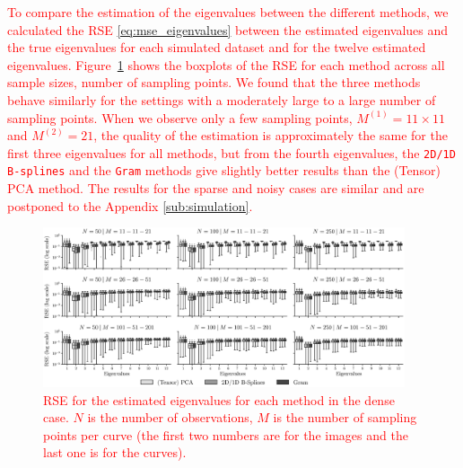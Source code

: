 \begin{results}
\textcolor{red}{To compare the estimation of the eigenvalues between the different methods, we calculated the RSE \eqref{eq:mse_eigenvalues} between the estimated eigenvalues and the true eigenvalues for each simulated dataset and for the twelve estimated eigenvalues.
Figure~\ref{fig:logAE_mfd_1d} shows the boxplots of the RSE for each method across all sample sizes, number of sampling points. We found that the three methods behave similarly for the settings with a moderately large to a large number of sampling points. When we observe only a few sampling points, $M^{(1)} = 11 \times 11$ and $M^{(2)} = 21$, the quality of the estimation is approximately the same for the first three eigenvalues for all methods, but from the fourth eigenvalues, the \texttt{2D/1D B-splines} and the \texttt{Gram} methods give slightly better results than the (Tensor) PCA method. The results for the sparse and noisy cases are similar and are postponed to the Appendix \ref{sub:simulation}.}

\begin{figure}
    \centering
    \includegraphics[width=0.95\textwidth]{figures/AE.eps}
    \caption{\textcolor{red}{RSE for the estimated eigenvalues for each method in the dense case. $N$ is the number of observations, $M$ is the number of sampling points per curve (the first two numbers are for the images and the last one is for the curves).}}
    \label{fig:logAE_mfd_1d}
\end{figure}
\end{results}

